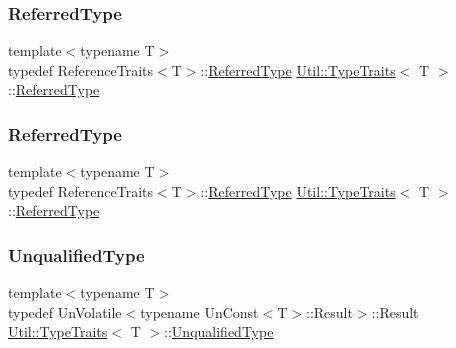 \mbox{\label{classUtil_1_1TypeTraits_a89aec1a9db97b7f70e59b6738c5df4f9}} 
\subsubsection{\texorpdfstring{ReferredType}{ReferredType}\hspace{0.1cm}{\footnotesize\ttfamily [1/2]}}
{\footnotesize\ttfamily template$<$typename T$>$ \\
typedef Reference\+Traits$<$T$>$\+::\mbox{\hyperlink{classUtil_1_1TypeTraits_a89aec1a9db97b7f70e59b6738c5df4f9}{Referred\+Type}} \mbox{\hyperlink{classUtil_1_1TypeTraits}{Util\+::\+Type\+Traits}}$<$ T $>$\+::\mbox{\hyperlink{classUtil_1_1TypeTraits_a89aec1a9db97b7f70e59b6738c5df4f9}{Referred\+Type}}}

\mbox{\label{classUtil_1_1TypeTraits_a89aec1a9db97b7f70e59b6738c5df4f9}} 
\subsubsection{\texorpdfstring{ReferredType}{ReferredType}\hspace{0.1cm}{\footnotesize\ttfamily [2/2]}}
{\footnotesize\ttfamily template$<$typename T$>$ \\
typedef Reference\+Traits$<$T$>$\+::\mbox{\hyperlink{classUtil_1_1TypeTraits_a89aec1a9db97b7f70e59b6738c5df4f9}{Referred\+Type}} \mbox{\hyperlink{classUtil_1_1TypeTraits}{Util\+::\+Type\+Traits}}$<$ T $>$\+::\mbox{\hyperlink{classUtil_1_1TypeTraits_a89aec1a9db97b7f70e59b6738c5df4f9}{Referred\+Type}}}

\mbox{\label{classUtil_1_1TypeTraits_a9d25b7cafbc7acafa3275b5fe5a04ee0}} 
\subsubsection{\texorpdfstring{UnqualifiedType}{UnqualifiedType}\hspace{0.1cm}{\footnotesize\ttfamily [1/2]}}
{\footnotesize\ttfamily template$<$typename T$>$ \\
typedef Un\+Volatile$<$typename Un\+Const$<$T$>$\+::Result$>$\+::Result \mbox{\hyperlink{classUtil_1_1TypeTraits}{Util\+::\+Type\+Traits}}$<$ T $>$\+::\mbox{\hyperlink{classUtil_1_1TypeTraits_a9d25b7cafbc7acafa3275b5fe5a04ee0}{Unqualified\+Type}}}


